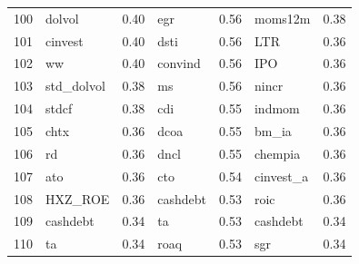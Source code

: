 \begin{footnotesize}
\begin{longtable}{rlc|lc|lc}
		100                       & dolvol                      & 0.40                          & egr                         & 0.56                          & moms12m                           & 0.38           \\
		101                       & cinvest                     & 0.40                          & dsti                        & 0.56                          & LTR                               & 0.36           \\
		102                       & ww                          & 0.40                          & convind                     & 0.56                          & IPO                               & 0.36           \\
		103                       & std\_dolvol                 & 0.38                          & ms                          & 0.56                          & nincr                             & 0.36           \\
		104                       & stdcf                       & 0.38                          & cdi                         & 0.55                          & indmom                            & 0.36           \\
		105                       & chtx                        & 0.36                          & dcoa                        & 0.55                          & bm\_ia                            & 0.36           \\
		106                       & rd                          & 0.36                          & dncl                        & 0.55                          & chempia                           & 0.36           \\
		107                       & ato                         & 0.36                          & cto                         & 0.54                          & cinvest\_a                        & 0.36           \\
		108                       & HXZ\_ROE                    & 0.36                          & cashdebt                    & 0.53                          & roic                              & 0.36           \\
		109                       & cashdebt                    & 0.34                          & ta                          & 0.53                          & cashdebt                          & 0.34           \\
		110                       & ta                          & 0.34                          & roaq                        & 0.53                          & sgr                               & 0.34           \\

\end{longtable}
\end{footnotesize}
